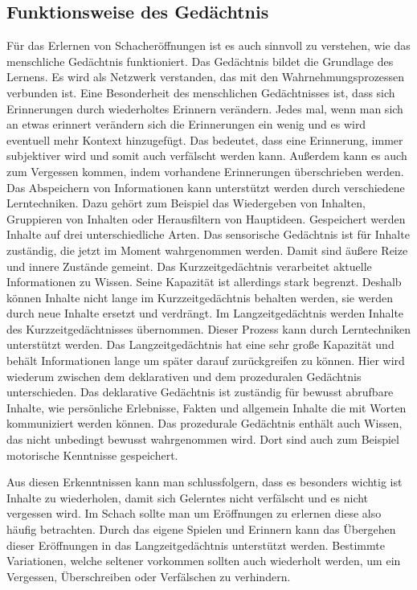 \subsection{Funktionsweise des Gedächtnis}\label{gedächtnis}
Für das Erlernen von Schacheröffnungen ist es auch sinnvoll zu verstehen, wie das menschliche Gedächtnis funktioniert. Das Gedächtnis bildet die Grundlage des Lernens. Es wird als Netzwerk verstanden, das mit den Wahrnehmungsprozessen verbunden ist. Eine Besonderheit des menschlichen Gedächtnisses ist, dass sich Erinnerungen durch wiederholtes Erinnern verändern. Jedes mal, wenn man sich an etwas erinnert verändern sich die Erinnerungen ein wenig und es wird eventuell mehr Kontext hinzugefügt. Das bedeutet, dass eine Erinnerung, immer subjektiver wird und somit auch verfälscht werden kann. Außerdem kann es auch zum Vergessen kommen, indem vorhandene Erinnerungen überschrieben werden. Das Abspeichern von Informationen kann unterstützt werden durch verschiedene Lerntechniken. Dazu gehört zum Beispiel das Wiedergeben von Inhalten, Gruppieren von Inhalten oder Herausfiltern von Hauptideen. Gespeichert werden Inhalte auf drei unterschiedliche Arten. Das sensorische Gedächtnis ist für Inhalte zuständig, die jetzt im Moment wahrgenommen werden. Damit sind äußere Reize und innere Zustände gemeint. Das Kurzzeitgedächtnis verarbeitet aktuelle Informationen zu Wissen. Seine Kapazität ist allerdings stark begrenzt. Deshalb können Inhalte nicht lange im Kurzzeitgedächtnis behalten werden, sie werden durch neue Inhalte ersetzt und verdrängt. Im Langzeitgedächtnis werden Inhalte des Kurzzeitgedächtnisses übernommen. Dieser Prozess kann durch Lerntechniken unterstützt werden. Das Langzeitgedächtnis hat eine sehr große Kapazität und behält Informationen lange um später darauf zurückgreifen zu können. Hier wird wiederum zwischen dem deklarativen und dem prozeduralen Gedächtnis unterschieden. Das deklarative Gedächtnis ist zuständig für bewusst abrufbare Inhalte, wie persönliche Erlebnisse, Fakten und allgemein Inhalte die mit Worten kommuniziert werden können. Das prozedurale Gedächtnis enthält auch Wissen, das nicht unbedingt bewusst wahrgenommen wird. Dort sind auch zum Beispiel motorische Kenntnisse gespeichert.
\cite{kron_grundwissen_2024}

Aus diesen Erkenntnissen kann man schlussfolgern, dass es besonders wichtig ist Inhalte zu wiederholen, damit sich Gelerntes nicht verfälscht und es nicht vergessen wird. Im Schach sollte man um Eröffnungen zu erlernen diese also häufig betrachten. Durch das eigene Spielen und Erinnern kann das Übergehen dieser Eröffnungen in das Langzeitgedächtnis unterstützt werden. Bestimmte Variationen, welche seltener vorkommen sollten auch wiederholt werden, um ein Vergessen, Überschreiben oder Verfälschen zu verhindern.


